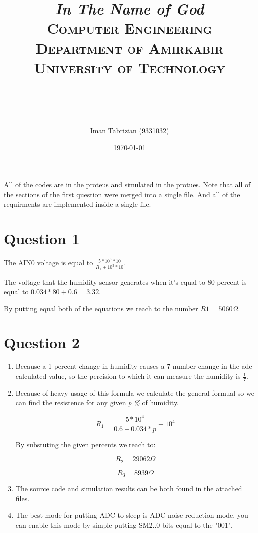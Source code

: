 \documentclass[paper=a4, fontsize=11pt]{scrartcl} %
\title{
\normalfont \normalsize
\textit{In The Name of God} \\ \textsc{Computer Engineering Department of Amirkabir University of Technology} \\ [25pt] \horrule{0.5pt} \\[0.4cm] %
\horrule{2pt} \\[0.5cm] %
}
\author{Iman Tabrizian (9331032)}
\date{\normalsize\today}
\numberwithin{equation}{section} %
\numberwithin{figure}{section} %
\numberwithin{table}{section} %
\begin{document}
\maketitle
\par All of the codes are in the proteus and simulated in the protues. Note that
all of the sections of the first question were merged into a single file. And all of
the requirments are implemented inside a single file.

\section{Question 1}
The AIN0 voltage is equal to $\frac{5 * 10 ^ 3 * 10}{R_1 + 10 ^ 3 * 10}$.

The voltage that the humidity sensor generates when it's equal to 80 percent
is equal to $0.034*80 + 0.6=3.32$.

By putting equal both of the equations we reach to the number $R1 = 5060 \Omega$.

\section{Question 2}
\begin{enumerate}
    \item
        Because a 1 percent change in humidity causes a 7 number change in the adc
        calculated value, so the percision to which it can measure the humidity is
        $\frac{1}{7}$.

    \item
        Because of heavy usage of this formula we calculate the general formual
        so we can find the resistence for any given \textit{p \%} of humidity.

        $$R_1=\frac{5*10^4}{0.6+0.034*p}-10^4$$

        By substuting the given percents we reach to:

        $$R_2 = 29062 \Omega$$

        $$R_3 = 8939 \Omega$$

    \item
        The source code and simulation results can be both found in the attached
        files.

    \item
        The best mode for putting ADC to sleep is ADC noise reduction mode.
        you can enable this mode by simple putting SM2..0 bits equal to the
        "001".





\end{enumerate}
\end{document}
